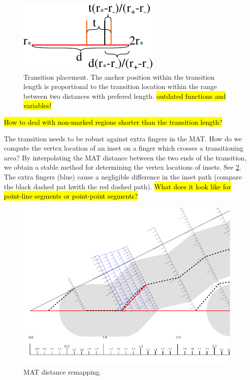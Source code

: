 \begin{figure}[H]
\centering
\includegraphics[width=.5\columnwidth]{sources/method/transition_location_precise.pdf}
\caption{Transition placement. The anchor position within the transition length is proportional to the transition location within the range between two distances with prefered length. \hl{outdated functions and variables!}}
\label{transition_length}
\end{figure}

\hl{How to deal with non-marked regions shorter than the transition length?}


The transition needs to be robust against extra fingers in the MAT.
How do we compute the vertex location of an inset on a finger which crosses a transitioning area?
By interpolating the MAT distance between the two ends of the transition, we obtain a stable method for determining the vertex locations of insets.
See \cref{distance_rounding_transition}.
The extra fingers (blue) cause a negligible difference in the inset path (compare the black dashed pat hwith the red dashed path).
\hl{What does it look like for point-line segments or point-point segments?}

\begin{figure}[H]
\centering
\includegraphics[width=.9\columnwidth]{sources/method/distance_rounding_transition.pdf}
\caption{MAT distance remapping.}
\label{distance_rounding_transition}
\end{figure}


